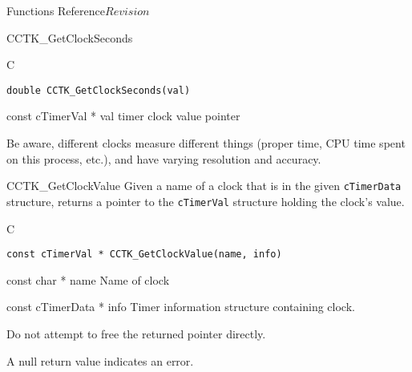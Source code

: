 \begin{cactuspart}{ Functions Reference}{}{$Revision$}
\begin{FunctionDescription}{CCTK\_GetClockSeconds}
\begin{SynopsisSection}
\begin{Synopsis}{C}
\begin{verbatim}
double CCTK_GetClockSeconds(val)
\end{verbatim}
\end{Synopsis}
\end{SynopsisSection}

\begin{ParameterSection}
\begin{Parameter}{const cTimerVal * val}
timer clock value pointer
\end{Parameter}
\end{ParameterSection}

\begin{Discussion}
Be aware, different clocks measure different things (proper time,
CPU time spent on this process, etc.), and have varying resolution
and accuracy.
\end{Discussion}
\end{FunctionDescription}


\begin{FunctionDescription}{CCTK\_GetClockValue}
\label{CCTK-GetClockValue}
Given a name of a clock that is
in the given {\tt cTimerData} structure,
returns a pointer to the {\tt cTimerVal} structure holding the clock's value.
\begin{SynopsisSection}
\begin{Synopsis}{C}
\begin{verbatim}
const cTimerVal * CCTK_GetClockValue(name, info)
\end{verbatim}
\end{Synopsis}
\end{SynopsisSection}

\begin{ParameterSection}
\begin{Parameter} {const char * name}
Name of clock
\end{Parameter}

\begin{Parameter} {const cTimerData * info}
Timer information structure containing clock.
\end{Parameter}
\end{ParameterSection}

\begin{Discussion}
Do not attempt to free the returned pointer directly.
\end{Discussion}
\begin{ErrorSection}
\begin{Error}
A null return value indicates an error.
\end{Error}
\end{ErrorSection}
\end{FunctionDescription}




\end{cactuspart}
